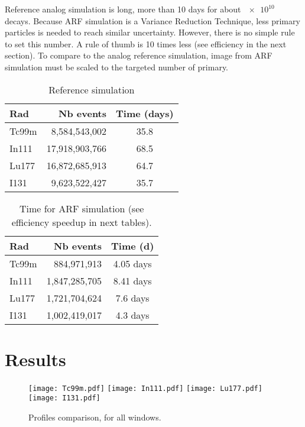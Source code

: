 \documentclass[11pt,final,a4paper]{article}
\begin{document}
Reference analog simulation is long, more than 10 days for about
$\num{e10}$ decays. Because ARF simulation is a Variance Reduction
Technique, less primary particles is needed to reach similar
uncertainty. However, there is no simple rule to set this number. A
rule of thumb is 10 times less (see efficiency in the next
section). To compare to the analog reference simulation, image from
ARF simulation must be scaled to the targeted number of primary.



\begin{table}[htbp]
  \centering
  \begin{tabular}[htbp]{lrc}
    Rad & Nb events & Time (days) \\\hline
    Tc99m & 8,584,543,002 & 35.8  \\
    In111 & 17,918,903,766 & 68.5  \\
    Lu177 & 16,872,685,913 & 64.7  \\
    I131 & 9,623,522,427 & 35.7  \\    
  \end{tabular}
  \caption{Reference simulation}
  \label{tab:ref_simu}  
\end{table}


\begin{table}[htbp]
  \centering
  \begin{tabular}[htbp]{lrc}
    Rad & Nb events & Time (d) \\\hline
    Tc99m & 884,971,913 &  4.05 days\\
    In111 & 1,847,285,705 & 8.41 days \\
    Lu177 & 1,721,704,624 & 7.6 days \\
    I131 & 1,002,419,017 & 4.3 days
  \end{tabular}
  \caption{Time for ARF simulation (see efficiency speedup in next tables).}
  \label{tab:ref_simu}  
\end{table}


\section{Results}


\begin{figure}[htbp]
  \begin{center}
    \texttt{[image: Tc99m.pdf]}
    \texttt{[image: In111.pdf]}
    \texttt{[image: Lu177.pdf]}
    \texttt{[image: I131.pdf]}
    \caption{Profiles comparison, for all windows.}
    \label{fig:profil}
  \end{center}
\end{figure}
\end{document}
